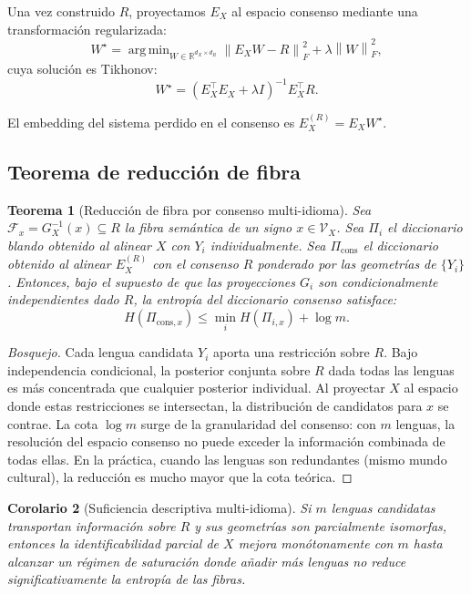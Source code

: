 \documentclass[11pt,a4paper]{article}
\newtheorem{theorem}{Teorema}[section]
\newtheorem{corollary}[theorem]{Corolario}
\DeclareMathOperator*{\argmin}{arg\,min}
\newcommand{\R}{\mathbb{R}}
\newcommand{\1}{\mathbf{1}}
\newcommand{\norm}[1]{\left\lVert #1 \right\rVert}
\newcommand{\VX}{\mathcal{V}_X}
\numberwithin{equation}{section}
\begin{document}
Una vez construido $R$, proyectamos $E_X$ al espacio consenso mediante una transformación regularizada:
\begin{equation}
    W^\star = \argmin_{W\in\R^{d_X\times d_R}} \norm{E_X W - R}_F^2 + \lambda\norm{W}_F^2,
\end{equation}
cuya solución es Tikhonov:
\begin{equation}
    W^\star = (E_X^{\top}E_X + \lambda I)^{-1} E_X^{\top} R.
\end{equation}

El embedding del sistema perdido en el consenso es $E_X^{(R)} = E_X W^\star$.

\subsection{Teorema de reducción de fibra}

\begin{theorem}[Reducción de fibra por consenso multi-idioma]
Sea $\mathcal{F}_x = G_X^{-1}(x)\subseteq R$ la fibra semántica de un signo $x\in\VX$. Sea $\Pi_i$ el diccionario blando obtenido al alinear $X$ con $Y_i$ individualmente. Sea $\Pi_{\text{cons}}$ el diccionario obtenido al alinear $E_X^{(R)}$ con el consenso $R$ ponderado por las geometrías de $\{Y_i\}$. Entonces, bajo el supuesto de que las proyecciones $G_i$ son condicionalmente independientes dado $R$, la entropía del diccionario consenso satisface:
\begin{equation}
    H(\Pi_{\text{cons},x}) \leq \min_i H(\Pi_{i,x}) + \log m.
\end{equation}
\end{theorem}

\begin{proof}[Bosquejo]
Cada lengua candidata $Y_i$ aporta una restricción sobre $R$. Bajo independencia condicional, la posterior conjunta sobre $R$ dada todas las lenguas es más concentrada que cualquier posterior individual. Al proyectar $X$ al espacio donde estas restricciones se intersectan, la distribución de candidatos para $x$ se contrae. La cota $\log m$ surge de la granularidad del consenso: con $m$ lenguas, la resolución del espacio consenso no puede exceder la información combinada de todas ellas. En la práctica, cuando las lenguas son redundantes (mismo mundo cultural), la reducción es mucho mayor que la cota teórica.
\end{proof}

\begin{corollary}[Suficiencia descriptiva multi-idioma]
Si $m$ lenguas candidatas transportan información sobre $R$ y sus geometrías son parcialmente isomorfas, entonces la identificabilidad parcial de $X$ mejora monótonamente con $m$ hasta alcanzar un régimen de saturación donde añadir más lenguas no reduce significativamente la entropía de las fibras.
\end{corollary}
\end{document}
